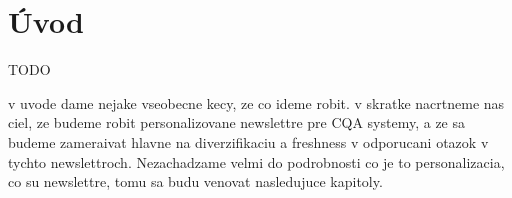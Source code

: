 \newpage
\chapter{Úvod}

TODO

v uvode dame nejake vseobecne kecy, ze co ideme robit. v skratke nacrtneme nas ciel, ze budeme robit personalizovane
newslettre pre CQA systemy, a ze sa budeme zameraivat hlavne na diverzifikaciu a freshness v odporucani otazok v tychto newslettroch.
Nezachadzame velmi do podrobnosti co je to personalizacia, co su newslettre, tomu sa budu venovat nasledujuce kapitoly.
